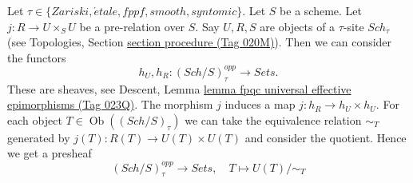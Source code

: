 \documentclass{amsart}
\theoremstyle{plain}
\theoremstyle{definition}
\theoremstyle{remark}
\numberwithin{equation}{subsection}
\def\Sch{\mathit{Sch}}
\def\Ob{\mathop{\mathrm{Ob}}\nolimits}
\def\etale{{\acute{e}tale}}
\begin{document}
Let $\tau \in \{Zariski, \etale, fppf, smooth, syntomic\}$.
Let $S$ be a scheme.
Let $j : R \to U \times_S U$ be a pre-relation over $S$.
Say $U, R, S$ are objects of a $\tau$-site $\Sch_\tau$
(see Topologies, Section \href{https://stacks.math.columbia.edu/tag/020M}{section procedure (Tag 020M)}).
Then we can consider the functors
$$
h_U, h_R :
(\Sch/S)_\tau^{opp}
\longrightarrow
\textit{Sets}.
$$
These are sheaves, see
Descent, Lemma \href{https://stacks.math.columbia.edu/tag/023Q}{lemma fpqc universal effective epimorphisms (Tag 023Q)}.
The morphism $j$ induces a map $j : h_R \to h_U \times h_U$.
For each object $T \in \Ob((\Sch/S)_\tau)$
we can take the equivalence relation $\sim_T$ generated by
$j(T) : R(T) \to U(T) \times U(T)$ and consider the quotient.
Hence we get a presheaf
\begin{equation}
\label{equation-quotient-presheaf}
(\Sch/S)_\tau^{opp}
\longrightarrow
\textit{Sets}, \quad
T \longmapsto U(T)/\sim_T
\end{equation}
\end{document}

